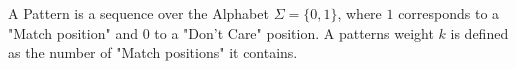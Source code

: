 \begin{mydef}
	A Pattern is a sequence over the Alphabet $\Sigma = \{0, 1\}$, where $1$ corresponds to a "Match position" and $0$ to a "Don't Care" position. A patterns weight $k$ is defined as the number of "Match positions" it contains.
	\label{def:pattern}
\end{mydef}

%
%
